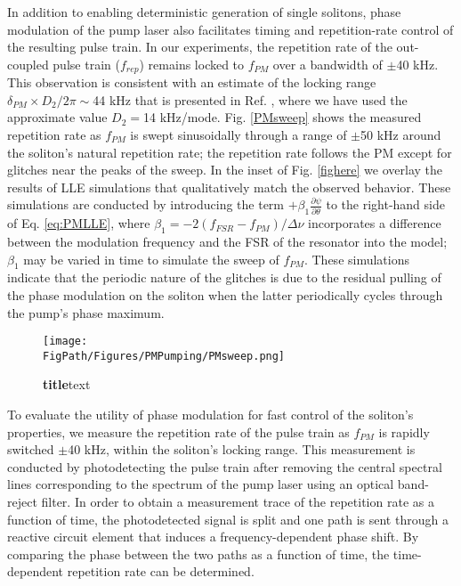 In addition to enabling deterministic generation of single solitons, phase modulation of the pump laser also facilitates timing and repetition-rate control of the resulting pulse train.  In our experiments, the repetition rate of the out-coupled pulse train ($f_{rep}$) remains locked to $f_{PM}$ over a bandwidth of $\pm$40 kHz. This observation is consistent with an estimate of the locking range $\delta_{PM}\times D_2/2\pi\sim$44 kHz that is presented in Ref. \cite{Jang2015a}, where we have used the approximate value $D_2=$14 kHz/mode. Fig. \ref{PMsweep} shows the measured repetition rate as $f_{PM}$ is swept sinusoidally through a range of $\pm$50 kHz around the soliton's natural repetition rate; the repetition rate follows the PM except for glitches near the peaks of the sweep. In the inset of Fig. \ref{fighere} we overlay the results of LLE simulations that qualitatively match the observed behavior. These simulations are conducted by introducing the term $+\beta_1\frac{\partial\psi}{\partial\theta}$ to the right-hand side of Eq. \ref{eq:PMLLE}, where $\beta_1=-2(f_{FSR}-f_{PM})/\Delta\nu$ incorporates a difference between the modulation frequency and the FSR of the resonator into the model; $\beta_1$ may be varied in time to simulate the sweep of $f_{PM}$. These simulations indicate that the periodic nature of the glitches is due to the residual pulling of the phase modulation on the soliton when the latter periodically cycles through the pump’s phase maximum.

\begin{figure}[htpb]
	\begin{center}
		\texttt{[image: \\FigPath/Figures/PMPumping/PMsweep.png]}
	\end{center}
	\caption[Figure Title]{\textbf{title}text}
	\label{fig:PMsweep}
\end{figure} 


To evaluate the utility of phase modulation for fast control of the soliton's properties, we measure the repetition rate of the pulse train as $f_{PM}$ is rapidly switched $\pm$40 kHz, within the soliton's locking range. This measurement is conducted by photodetecting the pulse train after removing the central spectral lines corresponding to the spectrum of the pump laser using an optical band-reject filter. In order to obtain a measurement trace of the repetition rate as a function of time, the photodetected signal is split and one path is sent through a reactive circuit element that induces a frequency-dependent phase shift. By comparing the phase between the two paths as a function of time, the time-dependent repetition rate can be determined.

